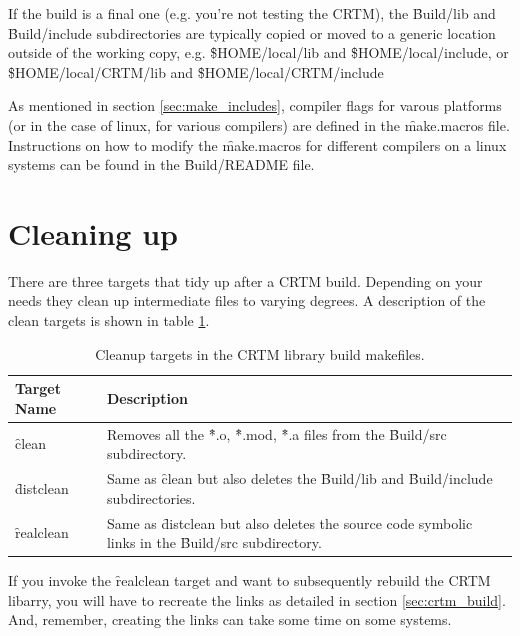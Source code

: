 If the build is a final one (e.g. you're not testing the CRTM), the \f{Build/lib} and \f{Build/include} subdirectories are typically copied or moved to a generic location outside of the working copy, e.g. \f{\$HOME/local/lib} and \f{\$HOME/local/include}, or \f{\$HOME/local/CRTM/lib} and \f{\$HOME/local/CRTM/include}

As mentioned in section \ref{sec:make_includes}, compiler flags for varous platforms (or in the case of linux, for various compilers) are defined in the \f{make.macros} file. Instructions on how to modify the \f{make.macros} for different compilers on a linux systems can be found in the \f{Build/README} file.

\section{Cleaning up}
There are three targets that tidy up after a CRTM build. Depending on your needs they clean up intermediate files to varying degrees. A description of the clean targets is shown in table \ref{tab:clean_up}.

\begin{table}[htb]
  \centering
  \begin{tabular}{p{2.5cm} p{11.5cm}}
    \hline
    \sffamily\textbf{Target Name} & \sffamily\textbf{Description} \\
    \hline\hline
    \f{clean}     & Removes all the \f{*.o}, \f{*.mod}, \f{*.a} files from the \f{Build/src} subdirectory. \\
    \f{distclean} & Same as \f{clean} but also deletes the \f{Build/lib} and \f{Build/include} subdirectories. \\
    \f{realclean} & Same as \f{distclean} but also deletes the source code symbolic links in the \f{Build/src} subdirectory.\\
    \hline
  \end{tabular}
  \caption{Cleanup targets in the CRTM library build makefiles.}
  \label{tab:clean_up}
\end{table}
If you invoke the \f{realclean} target and want to subsequently rebuild the CRTM libarry, you will have to recreate the links as detailed in section \ref{sec:crtm_build}. And, remember, creating the links can take some time on some systems.


\begin{appendix}

\end{appendix}




